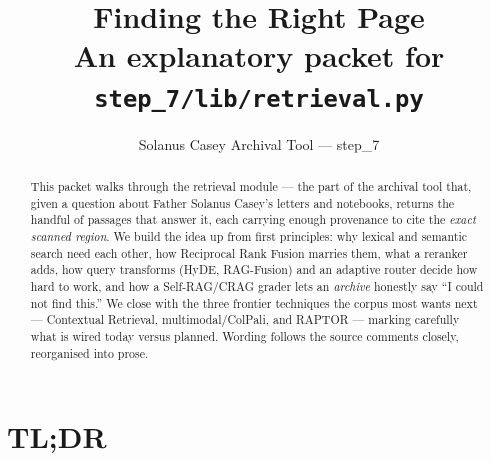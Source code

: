 \documentclass[11pt]{article}
\title{\bfseries Finding the Right Page\\[2pt]
\large An explanatory packet for \texttt{step\_7/lib/retrieval.py}}
\author{Solanus Casey Archival Tool --- step\_7}
\date{}
\begin{document}
\maketitle

\begin{abstract}
This packet walks through the retrieval module --- the part of the archival tool that, given a
question about Father Solanus Casey's letters and notebooks, returns the handful of passages that
answer it, each carrying enough provenance to cite the \emph{exact scanned region}. We build the
idea up from first principles: why lexical and semantic search need each other, how Reciprocal Rank
Fusion marries them, what a reranker adds, how query transforms (HyDE, RAG-Fusion) and an adaptive
router decide how hard to work, and how a Self-RAG/CRAG grader lets an \emph{archive} honestly say
``I could not find this.'' We close with the three frontier techniques the corpus most wants next
--- Contextual Retrieval, multimodal/ColPali, and RAPTOR --- marking carefully what is wired today
versus planned. Wording follows the source comments closely, reorganised into prose.
\end{abstract}

\tableofcontents
\bigskip

\section{TL;DR}
\end{document}
